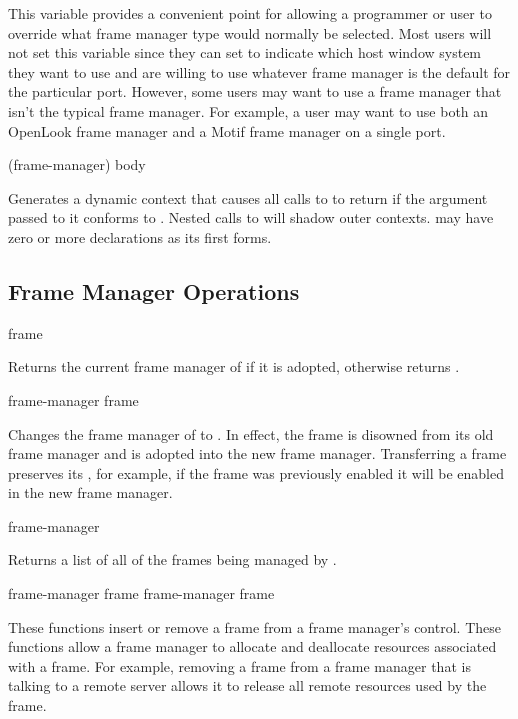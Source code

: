 
This variable provides a convenient point for allowing a programmer or user to
override what frame manager type would normally be selected.  Most users will
not set this variable since they can set  to indicate
which host window system they want to use and are willing to use whatever frame
manager is the default for the particular port.  However, some users may want to
use a frame manager that isn't the typical frame manager.  For example, a user
may want to use both an OpenLook frame manager and a Motif frame manager on a
single port.

 {(frame-manager) \body body}

Generates a dynamic context that causes all calls to  to
return  if the  argument passed to it conforms to
.  Nested calls to  will shadow outer
contexts.   may have zero or more declarations as its first forms.


\subsection {Frame Manager Operations}

 {frame}

Returns the current frame manager of  if it is adopted, otherwise
returns .

 {frame-manager frame}

Changes the frame manager of  to .  In effect, the
frame is disowned from its old frame manager and is adopted into the new frame
manager.  Transferring a frame preserves its , for example, if
the frame was previously enabled it will be enabled in the new frame manager.

 {frame-manager}

Returns a list of all of the frames being managed by .
\ReadOnly

 {frame-manager frame}
 {frame-manager frame}

These functions insert or remove a frame from a frame manager's control.  These
functions allow a frame manager to allocate and deallocate resources associated
with a frame.  For example, removing a frame from a frame manager that is
talking to a remote server allows it to release all remote resources used by the
frame.

